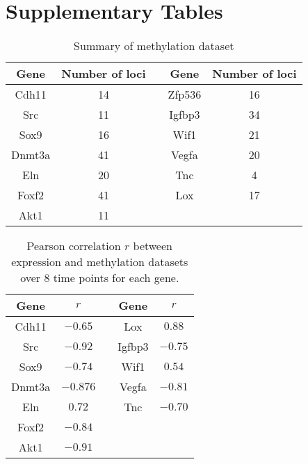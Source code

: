 \documentclass[10pt]{article}
\begin{document}
\section*{Supplementary Tables}

\begin{table}[ht]
\centering
\begin{tabular}{|c|c|c|c|c|}
\hline
Gene & Number of loci  & & Gene & Number of loci  \\
\hline
Cdh11 & 14 & & Zfp536 & 16 \\
\hline
Src & 11 & & Igfbp3 & 34 \\
\hline
Sox9 & 16 & & Wif1 & 21 \\
\hline
Dnmt3a & 41 & & Vegfa & 20 \\
\hline
Eln & 20 & & Tnc & 4 \\
\hline
Foxf2 & 41 & & Lox & 17 \\
\hline
Akt1 & 11 & & &  \\
\hline
\end{tabular}
\caption{Summary of methylation dataset}
\label{tab:sup1}
\end{table}
\clearpage


\begin{table}[ht]
\centering
\begin{tabular}{|c|c|c|c|c|}
\hline
Gene & $r$  & & Gene & $r$ \\
\hline
Cdh11 & $-0.65$ & & Lox & $0.88$ \\
\hline
Src & $-0.92$ & & Igfbp3 & $-0.75$ \\
\hline
Sox9 & $-0.74$ & & Wif1 & $0.54$ \\
\hline
Dnmt3a & $-0.876$ & & Vegfa & $-0.81$ \\
\hline
Eln & $0.72$ & & Tnc & $-0.70$ \\
\hline
Foxf2 & $-0.84$ & & & \\
\hline
Akt1 & $-0.91$ & & &  \\
\hline
\end{tabular}
\caption{Pearson correlation $r$  between expression and
  methylation datasets over $8$ time points for each gene.}
\label{tab:sup2}
\end{table}

\newpage



\end{document}
